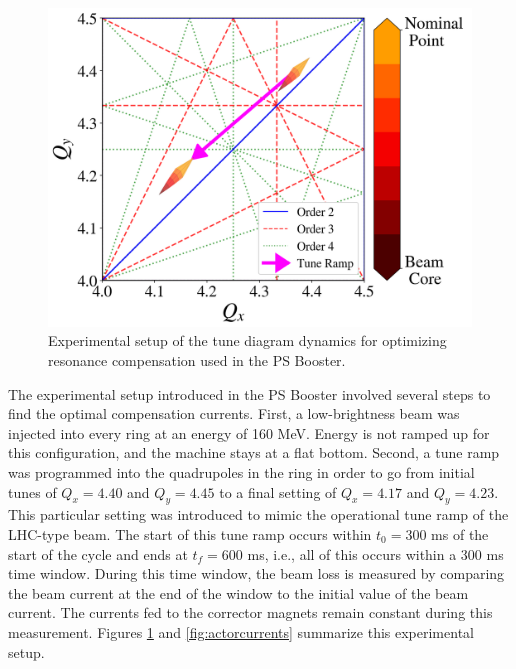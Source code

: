 \begin{figure}[H]
    \centering
    \includegraphics[width=\linewidth]{chapter5/experiment.png}
    \caption{Experimental setup of the tune diagram dynamics for optimizing resonance compensation used in the PS Booster.}
    \label{fig:experimentPSB}
   \vspace{-1.25em}
\end{figure}

The experimental setup introduced in the PS Booster involved several steps to find the optimal compensation currents. First, a low-brightness beam was injected into every ring at an energy of 160 MeV. Energy is not ramped up for this configuration, and the machine stays at a flat bottom. Second, a tune ramp was programmed into the quadrupoles in the ring in order to go from initial tunes of $Q_x = 4.40$ and $Q_y = 4.45$ to a final setting of $Q_x = 4.17$ and $Q_y = 4.23$. This particular setting was introduced to mimic the operational tune ramp of the LHC-type beam. The start of this tune ramp occurs within $t_0 = 300$ ms of the start of the cycle and ends at $t_f = 600$ ms, i.e., all of this occurs within a 300 ms time window. During this time window, the beam loss is measured by comparing the beam current at the end of the window to the initial value of the beam current. The currents fed to the corrector magnets remain constant during this measurement. Figures \ref{fig:experimentPSB} and \ref{fig:actorcurrents} summarize this experimental setup. 

